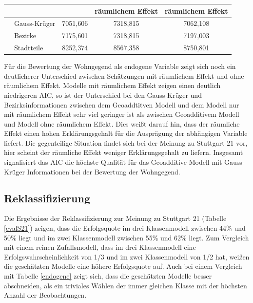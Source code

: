 \documentclass{Vorlage}
\begin{document}
\begin{table}[h]
\begin{tabular}{llccc}
                          & \multicolumn{1}{l|}{}             & \multicolumn{1}{c|}{}                                     & \multicolumn{1}{c|}{räumlichem Effekt} & räumlichem Effekt \\ \hline
                          & \multicolumn{1}{l|}{Gauss-Krüger} & \multicolumn{1}{c|}{7051,606}                             & \multicolumn{1}{c|}{7318,815}          & 7062,108          \\
                          & \multicolumn{1}{l|}{Bezirke}      & \multicolumn{1}{c|}{7175,601}                             & \multicolumn{1}{c|}{7318,815}          & 7197,003          \\
                          & \multicolumn{1}{l|}{Stadtteile}   & \multicolumn{1}{c|}{8252,374}                             & \multicolumn{1}{c|}{8567,358}          & 8750,801          \\ \hline \hline
\end{tabular}
\end{table}

Für die Bewertung der Wohngegend als endogene Variable zeigt sich noch ein deutlicherer Unterschied zwischen Schätzungen mit räumlichem Effekt und ohne räumlichem Effekt. Modelle mit räumlichem Effekt zeigen einen deutlich niedrigeren AIC, so ist der Unterschied bei den Gauss-Krüger und Bezirksinformationen zwischen dem Geoaddtitven Modell und dem Modell nur mit räumlichem Effekt sehr viel geringer ist als zwischen Geoadditivem Modell und Modell ohne räumlichem Effekt. Dies weißt darauf hin, dass der räumliche Effekt einen hohen Erklärungsgehalt für die Ausprägung der abhängigen Variable liefert. Die gegenteilige Situation findet sich bei der Meinung zu Stuttgart 21 vor, hier scheint der räumliche Effekt weniger Erklärungsgehalt zu liefern. Insgesamt signalisiert das AIC die höchste Qualität für das Geoadditive Modell mit Gauss-Krüger Informationen bei der Bewertung der Wohngegend.

\subsection{Reklassifizierung}

Die Ergebnisse der Reklassifizierung zur Meinung zu Stuttgart 21 (Tabelle \ref{evalS21}) zeigen, dass die Erfolgsquote im drei Klassenmodell zwischen 44\% und 50\% liegt und im zwei Klassenmodell zwischen 55\% und 62\% liegt. Zum Vergleich mit einem reinen Zufallsmodell, dass im drei Klassenmodell eine Erfolgswahrscheinlichkeit von 1/3 und im zwei Klassenmodell von 1/2 hat, weißen die geschätzten Modelle eine höhere Erfolgsquote auf. Auch bei einem Vergleich mit Tabelle \ref{endogene} zeigt sich, dass die geschätzten Modelle besser abschneiden, als ein triviales Wählen der immer gleichen Klasse mit der höchsten Anzahl der Beobachtungen.
\end{document}
